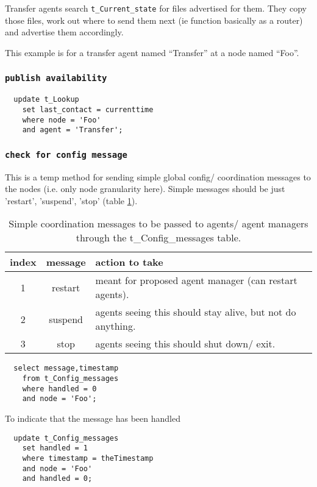 \documentclass{cmspaper}
\begin{document}
Transfer agents search \texttt{t\_Current\_state} for files advertised for them.  They copy those files, work out where to send them next (ie function basically as a router) and advertise them accordingly. 

This example is for a transfer agent named ``Transfer'' at a node named ``Foo''.

\subsubsection{\textbf{\texttt{publish availability}}}

{\small\begin{verbatim}
  update t_Lookup
    set last_contact = currenttime
    where node = 'Foo'
    and agent = 'Transfer';
\end{verbatim}}

\subsubsection{\textbf{\texttt{check for config message}}}
This is a temp method for sending simple global config/ coordination messages to the nodes (i.e. only node granularity here). Simple messages should be just 'restart', 'suspend', 'stop' (table \ref{table:messages}).

\begin{table}
\centering
\begin{tabular}[!h]{|c|c|l|} 
\hline index & message & action to take
\\ \hline
	1 & restart & meant for proposed agent manager (can restart agents).
\\	2 & suspend & agents seeing this should stay alive, but not do anything.
\\	3 & stop & agents seeing this should shut down/ exit.
\\ \hline
\end{tabular}
\caption{Simple coordination messages to be passed to agents/ agent managers through the t\_Config\_messages table.}
\label{table:messages}
\end{table}

{\small\begin{verbatim}
  select message,timestamp
  	from t_Config_messages
  	where handled = 0
  	and node = 'Foo';
\end{verbatim}}

To indicate that the message has been handled

{\small\begin{verbatim}
  update t_Config_messages
  	set handled = 1
  	where timestamp = theTimestamp
  	and node = 'Foo'
  	and handled = 0;
\end{verbatim}}
\end{document}
